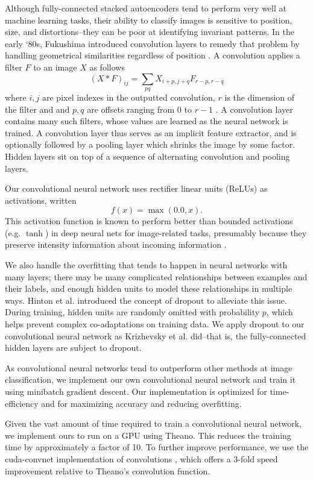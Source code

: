 \documentclass{acm_proc_article-sp}
\begin{document}
Although fully-connected stacked autoencoders tend to perform very well at machine learning tasks, their ability to classify images is sensitive to position, size, and distortions--they can be poor at identifying invariant patterns. In the early `80s, Fukushima introduced convolution layers to remedy that problem by handling geometrical similarities regardless of position \cite{Fukushima}. A convolution applies a filter $F$ to an image $X$ as follows 
$$ (X * F)_{ij} = \sum_{pq}{X_{i+p,j+q}F_{r-p,r-q}} $$
where $i,j$ are pixel indexes in the outputted convolution, $r$ is the dimension of the filter and and $p,q$ are offsets ranging from $0$ to $r-1$ \cite{larochelle_convnet}. A convolution layer contains many such filters, whose values are learned as the neural network is trained. A convolution layer thus serves as an implicit feature extractor, and is optionally followed by a pooling layer which shrinks the image by some factor. Hidden layers sit on top of a sequence of alternating convolution and pooling layers.

Our convolutional neural network uses rectifier linear units (ReLUs) as activations, written  $$f(x) = \max(0.0, x).$$ This activation function is known to perform better than bounded activations (e.g. $\tanh$) in deep neural nets for image-related tasks, presumably because they preserve intensity information about incoming information \cite{Nair}.

We also handle the overfitting that tends to happen in neural networks with many layers; there may be many complicated relationships between examples and their labels, and enough hidden units to model these relationships in multiple ways. Hinton et al. \cite{Hinton} introduced the concept of dropout to alleviate this issue. During training, hidden units are randomly omitted with probability $p$, which helps prevent complex co-adaptations on training data. We apply dropout to our convolutional neural network as Krizhevsky et al. \cite{Krizhevsky} did--that is, the fully-connected hidden layers are subject to dropout.

As convolutional neural networks tend to outperform other methods at image classification, we implement our own convolutional neural network and train it using minibatch gradient descent. Our implementation is optimized for time-efficiency and for maximizing accuracy and reducing overfitting.

Given the vast amount of time required to train a convolutional neural network, we implement ours to run on a GPU using Theano. This reduces the training time by approximately a factor of 10. To further improve performance, we use the cuda-convnet implementation of convolutions \cite{Krizhevsky}, which offers a 3-fold speed improvement relative to Theano's convolution function.
\end{document}
